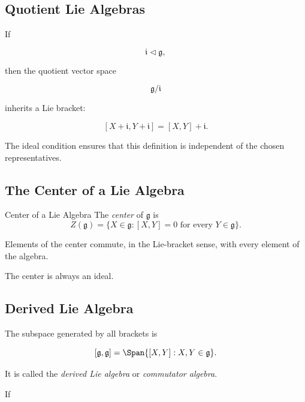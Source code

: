 \subsection{Quotient Lie Algebras}
\label{subsec:quotient-lie-algebras}

If

\[ \mathfrak i\triangleleft\mathfrak g, \]

then the quotient vector space

\[ \mathfrak g/\mathfrak i \]

inherits a Lie bracket:

\[ [X+\mathfrak i,Y+\mathfrak i]
=[X,Y]+\mathfrak i. \]

The ideal condition ensures that this definition is independent of the
chosen representatives.

\subsection{The Center of a Lie Algebra}
\label{subsec:center-lie-algebra}

\begin{definitionbox}{Center of a Lie Algebra}
The \emph{center} of \(\mathfrak g\) is
\[ Z(\mathfrak g)=\{X\in\mathfrak g:[X,Y]=0\text{ for every }Y\in\mathfrak g\}. \]
\end{definitionbox}

Elements of the center commute, in the Lie-bracket sense, with every element
of the algebra.

The center is always an ideal.

\subsection{Derived Lie Algebra}
\label{subsec:derived-lie-algebra}

The subspace generated by all brackets is

\[ [\mathfrak g,\mathfrak g]
=\Span\{[X,Y]:X,Y\in\mathfrak g\}. \]

It is called the \emph{derived Lie algebra} or \emph{commutator algebra}.

If

